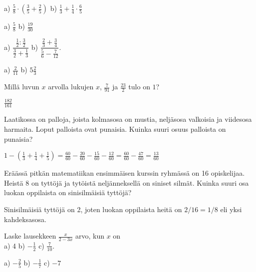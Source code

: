 \begin{tehtavasivu}
\begin{tehtava}
a) $\frac{5}{8}\cdot(\frac{3}{5}+\frac{2}{5})$ \qquad b) $\frac{1}{3}+\frac{1}{4}\cdot\frac{6}{5}$
\begin{vastaus}
a) $\frac{5}{8}$ \qquad b) $\frac{19}{30}$
\end{vastaus}
\end{tehtava}

\begin{tehtava}
a) $\dfrac{\frac{1}{2}:\frac{3}{2}}{\frac{3}{2}+\frac{1}{3}}$ \qquad b) $\dfrac{\frac{2}{3}+\frac{3}{4}}{\frac{5}{6}-\frac{7}{12}}$.
\begin{vastaus}
a) $\frac{2}{11}$ \qquad b) $5\frac{2}{3}$
\end{vastaus}
\end{tehtava}

\begin{tehtava}
Millä luvun $x$ arvolla lukujen $x$, $\frac{7}{91}$ ja $\frac{23}{2}$ tulo on $1$?
\begin{vastaus}
$\frac{182}{161}$
\end{vastaus}
\end{tehtava}

\begin{tehtava} 
        Laatikossa on palloja, joista kolmasosa on mustia, neljäsosa
        valkoisia ja viidesosa harmaita. Loput palloista ovat 		 	punaisia.
        Kuinka suuri osuus palloista on punaisia?
        
        \begin{vastaus}
            $1-(\frac{1}{3}+\frac{1}{4}+\frac{1}{5})
            = \frac{60}{60}-\frac{20}{60}-\frac{15}{60}-\frac{12}{60}
            = \frac{60}{60}-\frac{47}{60}
            = \frac{13}{60}$
        \end{vastaus}
    \end{tehtava}
    
\begin{tehtava} 
Eräässä pitkän matematiikan ensimmäisen kurssin ryhmässä on 16 opiskelijaa. Heistä 8 on tyttöjä ja tytöistä neljänneksellä on siniset silmät. Kuinka suuri osa luokan oppilaista on sinisilmäisiä tyttöjä?
        \begin{vastaus}
			Sinisilmäisiä tyttöjä on 2, joten luokan oppilaista heitä on $2/16=1/8$ eli yksi kahdeksasosa.
        \end{vastaus}
\end{tehtava}

\begin{tehtava}
Laske lausekkeen $\frac{x}{2-3x}$ arvo, kun $x$ on \\ a) 4 \qquad b) $-\frac{1}{2}$ \qquad c) $\frac{7}{10}$.
\begin{vastaus}
a) $-\frac{2}{5}$ \qquad b) $-\frac{1}{7}$ \qquad c) $-7$
\end{vastaus}
\end{tehtava}


\end{tehtavasivu}
